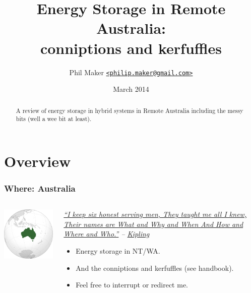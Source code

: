 \documentclass{beamer}
\title{Energy Storage in Remote Australia: \\
  conniptions and kerfuffles}
\author{Phil Maker \href{mailto:philip.maker@gmail.com}{\texttt{<philip.maker@gmail.com>}}}
\institute{ACEP/Powerwater Remote Operations}
\date{March 2014}
\begin{document}
\begin{frame}
  \maketitle
  \vspace{-1.2cm}
  \begin{abstract}
    \small A review of energy storage in hybrid systems in Remote Australia
    including the messy bits (well a wee bit at least).
  \end{abstract}
\end{frame}

\section{Overview}
\begin{frame}\frametitle{Where: Australia}
\begin{columns}
\begin{column}{7cm}
  \includegraphics[width=6cm]{AU.png}
\end{column}
\begin{column}{5cm}\it
\href{http://www.kiplingsociety.co.uk/poems_serving.htm}{``I keep six honest serving men,
They taught me all I knew,
Their names are What and Why and When
And How and Where and Who.''} -- \href{http://en.wikipedia.org/Rudyard_Kipling}{Kipling}
\pause
\begin{itemize}
\item Energy storage in NT/WA.\pause
\item And the conniptions and kerfuffles (see handbook).\pause
\item Feel free to interrupt or redirect me.
\end{itemize}
\end{column}
\end{columns}
\end{frame}
\end{document}
